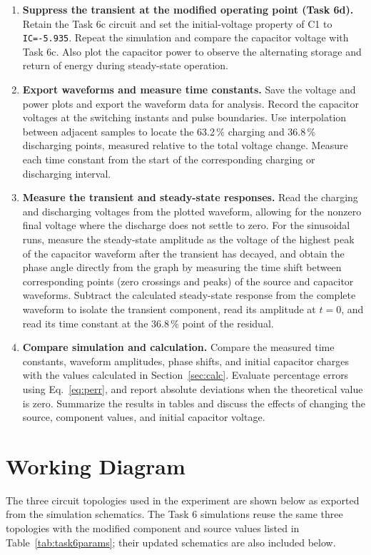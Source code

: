 \documentclass[12pt,a4paper]{article}
\begin{document}
\begin{enumerate}[label=\arabic*., leftmargin=2.5em, itemsep=6pt]
		\item \textbf{Suppress the transient at the modified operating
			point (Task 6d).}
		Retain the Task 6c circuit and set the initial-voltage property
		of C1 to \texttt{IC=-5.935}.  Repeat the simulation and
		compare the capacitor voltage with Task 6c.  Also plot the
		capacitor power to observe the alternating storage and return
		of energy during steady-state operation.
		
		\item \textbf{Export waveforms and measure time constants.}
		Save the voltage and power plots and export the waveform data
		for analysis.  Record the capacitor voltages at the switching
		instants and pulse boundaries.  Use interpolation between
		adjacent samples to locate the 63.2\,\% charging and
		36.8\,\% discharging points, measured relative to the total
		voltage change.  Measure each time constant from the start of
		the corresponding charging or discharging interval.
		
		\item \textbf{Measure the transient and steady-state
			responses.}
		Read the charging and discharging voltages from the plotted
		waveform, allowing for the nonzero final voltage where the
		discharge does not settle to zero.  For the sinusoidal runs,
		measure the steady-state amplitude as the voltage of the highest
		peak of the capacitor waveform after the transient has decayed,
		and obtain the phase angle directly from the graph by measuring
		the time shift between corresponding points (zero crossings and
		peaks) of the source and capacitor waveforms.  Subtract the
		calculated steady-state response from the complete waveform to
		isolate the transient component, read its amplitude at $t = 0$,
		and read its time constant at the $36.8\,\%$ point of the
		residual.
		
		\item \textbf{Compare simulation and calculation.}
		Compare the measured time constants, waveform amplitudes,
		phase shifts, and initial capacitor charges with the values
		calculated in Section~\ref{sec:calc}.  Evaluate percentage
		errors using Eq.~\eqref{eq:perr}, and report absolute
		deviations when the theoretical value is zero.  Summarize the
		results in tables and discuss the effects of changing the
		source, component values, and initial capacitor voltage.
	\end{enumerate}
	
	\section{Working Diagram}
	The three circuit topologies used in the experiment are shown below as
	exported from the simulation schematics.  The Task 6 simulations reuse
	the same three topologies with the modified component and source
	values listed in Table~\ref{tab:task6params}; their updated schematics
	are also included below.
	
\end{document}
